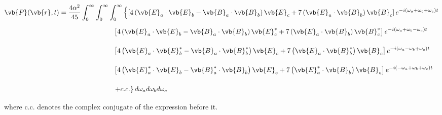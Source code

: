\documentclass[11pt,SymmetricalJury]{inrsthesis/inrsthesis}
\begin{document}
  \begin{align}
    \vb{P}(\vb{r},t)
      &= \frac{4\alpha^2}{45}\int_0^\infty\int_0^\infty\int_0^\infty
        \left\{
          \left[
            4\left(\vb{E}_a\cdot\vb{E}_b-\vb{B}_a\cdot\vb{B}_b\right)\vb{E}_c+7\left(\vb{E}_a\cdot\vb{B}_b\right)\vb{B}_c
          \right]e^{-i(\omega_a+\omega_b+\omega_c)t}
        \right. \nonumber\\
      & \phantom{\frac{4\alpha^2}{45}\int_0^\infty\int_0^\infty\int_0^\infty}
          \left[
            4\left(\vb{E}_a\cdot\vb{E}_b-\vb{B}_a\cdot\vb{B}_b\right)\vb{E}_c^*+7\left(\vb{E}_a\cdot\vb{B}_b\right)\vb{B}_c^*
          \right]e^{-i(\omega_a+\omega_b-\omega_c)t}
         \nonumber\\
      & \phantom{\frac{4\alpha^2}{45}\int_0^\infty\int_0^\infty\int_0^\infty}
          \left[
            4\left(\vb{E}_a\cdot\vb{E}_b^*-\vb{B}_a\cdot\vb{B}_b^*\right)\vb{E}_c+7\left(\vb{E}_a\cdot\vb{B}_b^*\right)\vb{B}_c
          \right]e^{-i(\omega_a-\omega_b+\omega_c)t}
         \nonumber\\
      & \phantom{\frac{4\alpha^2}{45}\int_0^\infty\int_0^\infty\int_0^\infty}
          \left[
            4\left(\vb{E}_a^*\cdot\vb{E}_b-\vb{B}_a^*\cdot\vb{B}_b\right)\vb{E}_c+7\left(\vb{E}_a^*\cdot\vb{B}_b\right)\vb{B}_c
          \right]e^{-i(-\omega_a+\omega_b+\omega_c)t}
         \nonumber\\
      &  \phantom{\frac{4\alpha^2}{45}\int_0^\infty\int_0^\infty\int_0^\infty} \left.+ c.c.\right\}d\omega_ad\omega_bd\omega_c
  \end{align}
where c.c. denotes the complex conjugate of the expression before it.
\end{document}
